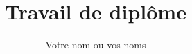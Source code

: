 \documentclass[11pt, a4paper]{article}			%
\begin{document}
\title{Travail de diplôme}						%
\author{Votre nom ou vos noms}
\date{}											%

\maketitle
\titlepage										%
\end{document}
